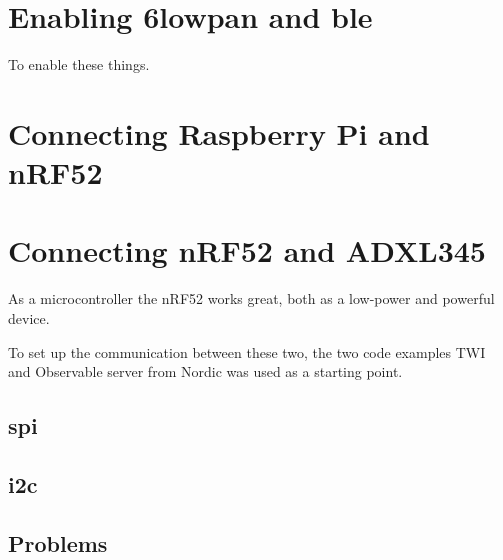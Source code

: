 \section{Enabling \gls{6lowpan} and \gls{ble}}

To enable these things. 

\section{Connecting Raspberry Pi and nRF52}

\section{Connecting nRF52 and ADXL345}

As a microcontroller the nRF52 works great, both as a low-power and powerful device. 

To set up the communication between these two, the two code examples TWI and Observable server from Nordic was used as a starting point. 


\subsection{\gls{spi}}



\subsection{\gls{i2c}}


\subsection{Problems}




